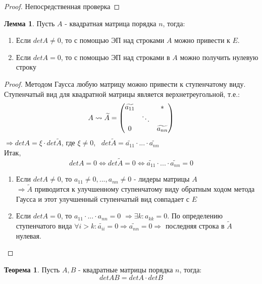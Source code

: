 \documentclass[a4paper, 12pt]{article}
\newcounter{lemcount}
\newcounter{lemcount2}
\newcounter{thcount}
\theoremstyle{definition}
\newtheorem{lemmanum2}[lemcount2]{Лемма}
\newtheorem{theoremnum}[thcount]{Теорема}
\begin{document}
  \begin{proof}
    Непосредственная проверка
  \end{proof}
  \begin{lemmanum2} \label{lemma2}
    Пусть $A$ - квадратная матрица порядка $n$, тогда:
    \begin{enumerate}
      \item Если $detA \not = 0$, то с помощью ЭП над строками $A$ можно привести к $E$. 
      \item Если $detA = 0$, то с помощью ЭП над строками в $A$ можно получить нулевую строку
    \end{enumerate}
  \end{lemmanum2} 
  \begin{proof}
    Методом Гаусса любую матрицу можно привести к ступенчатому виду. Ступенчатый вид для квадратной матрицы является верхнетреугольной, т.е.:
    $$A \leadsto \widetilde{A} = \begin{pmatrix}
      \widetilde{a_{11}} & \null & * \\
      \null & \ddots & \null \\
      0 & \null & \widetilde{a_{nn}}
    \end{pmatrix}$$  
    $\Longrightarrow detA = \xi \cdot det \widetilde{A}$, где $\xi \not = 0$, \ $det \widetilde{A} = \widetilde{a_{11}} \cdot ... \cdot \widetilde{a_{nn}}$\\
    Итак, 
    $$detA =0 \Longleftrightarrow  det \widetilde{A} = 0 \Longleftrightarrow \widetilde{a_{11}} \cdot ... \cdot \widetilde{a_{nn}} =0$$ 
    \begin{enumerate}
      \item Если $detA \not = 0$, то $a_{11} \not = 0,...,a_{nn} \not = 0$ - лидеры матрицы $A$ \\ $\Longrightarrow \widetilde{A}$  приводится к улучшенному ступенчатому виду обратным ходом метода Гаусса и этот улучшенный ступенчатый вид совпадает с $E$
      \item Если $detA = 0$, то $a_{11} \cdot...\cdot a_{nn} = 0$ $\Longrightarrow  \exists k: a_{kk} = 0$. По определению ступенчатого вида $\forall i > k: \widetilde{a_{ii}} = 0 \Longrightarrow \widetilde{a_{nn}} = 0 \Longrightarrow$ последняя строка в $\widetilde{A}$ нулевая.  
    \end{enumerate}
  \end{proof} 
  \begin{theoremnum}
    Пусть $A, B$ - квадратные матрицы порядка $n$, тогда: $$detAB = detA \cdot detB$$ 
  \end{theoremnum} 
\end{document}
